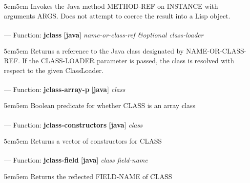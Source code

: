 \begin{adjustwidth}{5em}{5em}
Invokes the Java method METHOD-REF on INSTANCE with arguments ARGS. Does not attempt to coerce the result into a Lisp object.
\end{adjustwidth}

\paragraph{}
\label{JAVA:JCLASS}
--- Function: \textbf{jclass} [\textbf{java}] \textit{name-or-class-ref \&optional class-loader}

\begin{adjustwidth}{5em}{5em}
Returns a reference to the Java class designated by NAME-OR-CLASS-REF. If the CLASS-LOADER parameter is passed, the class is resolved with respect to the given ClassLoader.
\end{adjustwidth}

\paragraph{}
\label{JAVA:JCLASS-ARRAY-P}
--- Function: \textbf{jclass-array-p} [\textbf{java}] \textit{class}

\begin{adjustwidth}{5em}{5em}
Boolean predicate for whether CLASS is an array class
\end{adjustwidth}

\paragraph{}
\label{JAVA:JCLASS-CONSTRUCTORS}
--- Function: \textbf{jclass-constructors} [\textbf{java}] \textit{class}

\begin{adjustwidth}{5em}{5em}
Returns a vector of constructors for CLASS
\end{adjustwidth}

\paragraph{}
\label{JAVA:JCLASS-FIELD}
--- Function: \textbf{jclass-field} [\textbf{java}] \textit{class field-name}

\begin{adjustwidth}{5em}{5em}
Returns the reflected FIELD-NAME of CLASS
\end{adjustwidth}

